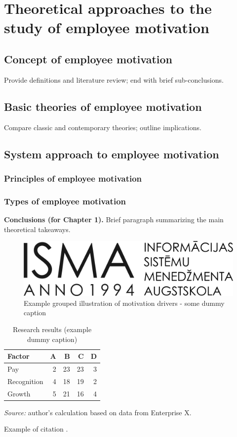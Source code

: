 \chapter{Theoretical approaches to the study of employee motivation}
\section{Concept of employee motivation}
Provide definitions and literature review; end with brief sub-conclusions.

\section{Basic theories of employee motivation}
Compare classic and contemporary theories; outline implications.

\section{System approach to employee motivation}
\subsection{Principles of employee motivation}
\subsection{Types of employee motivation}

\noindent\textbf{Conclusions (for Chapter 1).} Brief paragraph summarizing the main theoretical takeaways.

\begin{figure}[h]
  \centering
  \includegraphics[width=0.7\linewidth]{b_chapters/chapter1/assets/isma_logo.png}
  \caption{Example grouped illustration of motivation drivers - some dummy caption}
  \label{fig:motivation-drivers}
\end{figure}

{\singlespacing
\begin{table}[h]
  \caption{Research results (example dummy caption)}
  \label{tab:research-results}
  \centering
  \begin{tabular}{lrrrr}
    \toprule
    Factor & A & B & C & D\\
    \midrule
    Pay & 2 & 23 & 23 & 3\\
    Recognition & 4 & 18 & 19 & 2\\
    Growth & 5 & 21 & 16 & 4\\
    \bottomrule
  \end{tabular}

  \vspace{2mm}
  \emph{Source:} author’s calculation based on data from Enterprise X.


  Example of citation \cite{porter2008}.
\end{table}
}

